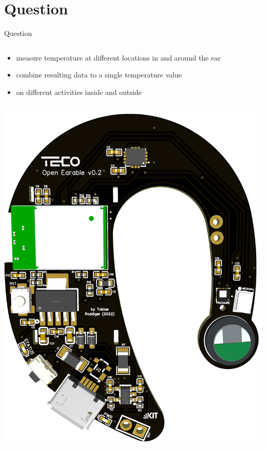 \documentclass[en]{sdqbeamer}
\begin{document}
\section{Question}
\begin{frame}[fragile]{Question}
    \begin{column}{0.58\textwidth}
        \begin{itemize}
            \item measure temperature at different locations in and around the ear
            \item combine resulting data to a single temperature value
            \item on different activities inside and outside
        \end{itemize}
    \end{column}
    \begin{column}{0.38\textwidth}    
        \includegraphics[scale=0.08]{proposal-presentation/images/open_earable.png}
    \end{column}
\end{frame}
\end{document}
